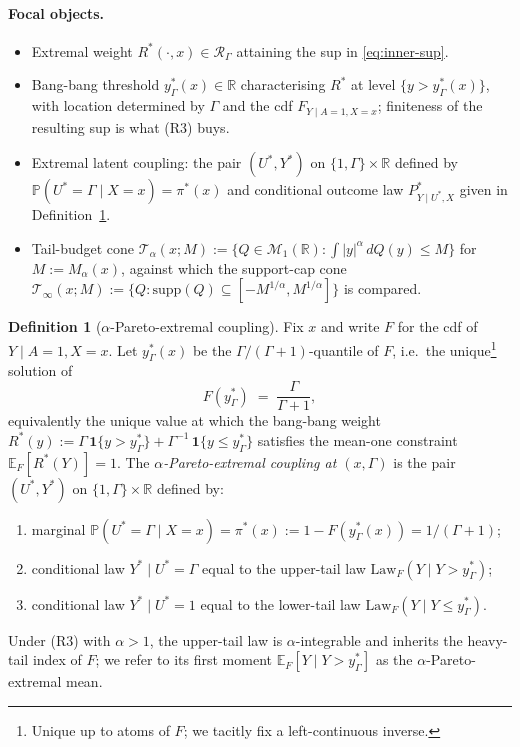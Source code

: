 \documentclass[11pt]{article}
\newcommand{\E}{\mathbb{E}}
\renewcommand{\Pr}{\mathbb{P}}
\newcommand{\R}{\mathbb{R}}
\theoremstyle{definition}
\newtheorem{definition}{Definition}
\theoremstyle{plain}
\theoremstyle{remark}
\begin{document}
\paragraph{Focal objects.}
\begin{itemize}[leftmargin=*]
  \item Extremal weight $R^*(\cdot, x) \in \mathcal{R}_\Gamma$ attaining the sup in \eqref{eq:inner-sup}.
  \item Bang-bang threshold $y_\Gamma^*(x) \in \R$ characterising $R^*$ at level $\{y > y_\Gamma^*(x)\}$, with location determined by $\Gamma$ and the cdf $F_{Y \mid A=1, X=x}$; finiteness of the resulting sup is what (R3) buys.
  \item Extremal latent coupling: the pair $(U^*, Y^*)$ on $\{1, \Gamma\} \times \R$ defined by $\Pr(U^* = \Gamma \mid X=x) = \pi^*(x)$ and conditional outcome law $P^*_{Y \mid U^*, X}$ given in Definition~\ref{def:pareto-extremal}.
  \item Tail-budget cone $\mathcal{T}_\alpha(x; M) := \{ Q \in \mathcal{M}_1(\R) : \int |y|^\alpha\,dQ(y) \le M \}$ for $M := M_\alpha(x)$, against which the support-cap cone $\mathcal{T}_\infty(x; M) := \{ Q : \mathrm{supp}(Q) \subseteq [-M^{1/\alpha}, M^{1/\alpha}] \}$ is compared.
\end{itemize}

\begin{definition}[$\alpha$-Pareto-extremal coupling]\label{def:pareto-extremal}
Fix $x$ and write $F$ for the cdf of $Y \mid A=1, X=x$. Let $y_\Gamma^*(x)$ be the $\Gamma/(\Gamma+1)$-quantile of $F$, i.e.\ the unique\footnote{Unique up to atoms of $F$; we tacitly fix a left-continuous inverse.} solution of
\begin{equation}
  F(y_\Gamma^*) \;=\; \frac{\Gamma}{\Gamma + 1}, \label{eq:thresh}
\end{equation}
equivalently the unique value at which the bang-bang weight $R^*(y) := \Gamma\,\mathbf{1}\{y > y_\Gamma^*\} + \Gamma^{-1}\,\mathbf{1}\{y \le y_\Gamma^*\}$ satisfies the mean-one constraint $\E_F[R^*(Y)] = 1$. The \emph{$\alpha$-Pareto-extremal coupling at $(x, \Gamma)$} is the pair $(U^*, Y^*)$ on $\{1, \Gamma\} \times \R$ defined by:
\begin{enumerate}[label=(\alph*)]
  \item marginal $\Pr(U^* = \Gamma \mid X = x) = \pi^*(x) := 1 - F(y_\Gamma^*(x)) = 1/(\Gamma + 1)$;
  \item conditional law $Y^* \mid U^* = \Gamma$ equal to the upper-tail law $\mathrm{Law}_F(Y \mid Y > y_\Gamma^*)$;
  \item conditional law $Y^* \mid U^* = 1$ equal to the lower-tail law $\mathrm{Law}_F(Y \mid Y \le y_\Gamma^*)$.
\end{enumerate}
Under (R3) with $\alpha > 1$, the upper-tail law is $\alpha$-integrable and inherits the heavy-tail index of $F$; we refer to its first moment $\E_F[Y \mid Y > y_\Gamma^*]$ as the $\alpha$-Pareto-extremal mean.
\end{definition}
\end{document}
